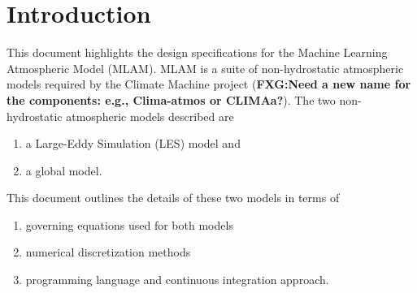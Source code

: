
\section{Introduction}
\label{sec:introduction}

This document highlights the design specifications for the Machine Learning Atmospheric Model (MLAM). MLAM is a suite of non-hydrostatic atmospheric models required by the Climate Machine  project (\textbf{FXG:Need a new name for the components: e.g., Clima-atmos or CLIMAa?}).  The two non-hydrostatic atmospheric models described are 
\begin{enumerate}
\item a Large-Eddy Simulation (LES) model and 
\item a global model.
\end{enumerate}
This document outlines the details of these two models in terms of 
\begin{enumerate}
\item governing equations  used for both models
\item numerical discretization methods
\item programming language and continuous integration approach.
\end{enumerate}
